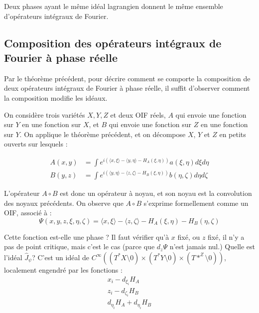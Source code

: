 \begin{corr}
	Deux phases ayant le même idéal lagrangien donnent le même ensemble d'opérateurs intégraux de Fourier.
\end{corr}

\subsection{Composition des opérateurs intégraux de Fourier à phase réelle}
Par le théorème précédent, pour décrire comment se comporte la composition de deux opérateurs intégraux de Fourier à phase réelle, il suffit d'observer comment la composition modifie les idéaux.

On considère trois variétés $X,Y,Z$ et deux OIF réels, $A$ qui envoie une fonction sur $Y$ en une fonction sur $X$, et $B$ qui envoie une fonction sur $Z$ en une fonction sur $Y$. On applique le théorème précédent, et on décompose $X$, $Y$ et $Z$ en petits ouverts sur lesquels :

\begin{align*}
	A(x,y)&=\int e^{i(\langle x,\xi\rangle - \langle y,\eta\rangle-H_A(\xi,\eta))}a(\xi,\eta)d\xi d\eta\\
	B(y,z)&=\int e^{i(\langle y,\eta\rangle - \langle z,\zeta\rangle -H_B(\xi,\eta))}b(\eta,\zeta)d\eta d\zeta
\end{align*}

L'opérateur $A\circ B$ est donc un opérateur à noyau, et son noyau est la convolution des noyaux précédents. On observe que $A\circ B$ s'exprime formellement comme un OIF, associé à :
\begin{equation}
	\Psi(x,y,z,\xi,\eta,\zeta)=\langle x,\xi\rangle - \langle z,\zeta\rangle - H_A(\xi,\eta)-H_B(\eta,\zeta)
\end{equation}

Cette fonction est-elle une phase ? Il faut vérifier qu'à $x$ fixé, ou $z$ fixé, il n'y a pas de point critique, mais c'est le cas (parce que $d_z\Psi$ n'est jamais nul.) Quelle est l'idéal $\hat{J}_{\psi}$? C'est un idéal de $C^{\infty}((T^*X \setminus 0)\times (T^*Y \setminus 0)\times (T*^Z \setminus 0) )$, localement engendré par les fonctions :
\begin{align*}
	x_i-d_{\xi_i}H_A\\
	z_i-d_{\zeta_i}H_B\\
	d_{\eta_i}H_A+d_{\eta_i}H_B
\end{align*}

